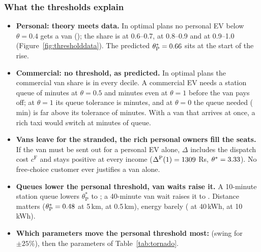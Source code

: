 \subsubsection{What the thresholds explain}
\begin{itemize}
  \item \textbf{Personal: theory meets data.} In optimal plans no personal EV below $\theta=0.4$ gets a van (\VanPersBelowFour\pct); the share is \VanPersSixSeven\pct{} at 0.6--0.7, \VanPersEightNine\pct{} at 0.8--0.9 and \VanPersNineTen\pct{} at 0.9--1.0 (Figure~\ref{fig:thresholddata}). The predicted $\theta^{*}_{\mathrm P}=0.66$ sits at the start of the rise.
  \item \textbf{Commercial: no threshold, as predicted.} In optimal plans the commercial van share is \VanCommOpt\pct{} in every decile. A commercial EV needs a station queue of \QNeededHalf{} minutes at $\theta=0.5$ and \QNeededOne{} minutes even at $\theta=1$ before the van pays off; at $\theta=1$ its queue tolerance is \WCommOne{} minutes, and at $\theta=0$ the queue needed (\QNeededZero{} min) is far above its tolerance of \WCommZero{} minutes. With a van that arrives at once, a rich taxi would switch at \QNeededOneNoWait{} minutes of queue.
  \item \textbf{Vans leave for the stranded, the rich personal owners fill the seats.} If the van must be sent out for a personal EV alone, $\Delta$ includes the dispatch cost $c^{\mathrm F}$ and stays positive at every income ($\Delta^{\mathrm P}(1)=1309$ Rs, $\theta^{*}=3.33$). No free-choice customer ever justifies a van alone.
  \item \textbf{Queues lower the personal threshold, van waits raise it.} A 10-minute station queue lowers $\theta^{*}_{\mathrm P}$ to \ThetaStarPQten; a 40-minute van wait raises it to \ThetaStarPWaitForty. Distance matters ($\theta^{*}_{\mathrm P}=0.48$ at 5\,km, \ThetaStarPNear{} at 0.5\,km), energy barely (\ThetaStarPEForty{} at 40\,kWh, \ThetaStarPETen{} at 10\,kWh).
  \item \textbf{Which parameters move the personal threshold most:} \TorTopSym{} (swing \TorTopSwing{} for $\pm25\%$), then the parameters of Table~\ref{tab:tornado}.
\end{itemize}


